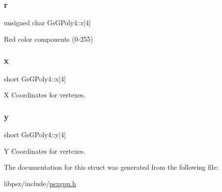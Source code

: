\subsubsection{\texorpdfstring{r}{r}}
{\footnotesize\ttfamily unsigned char Gs\+G\+Poly4\+::r\mbox{[}4\mbox{]}}



Red color components (0-\/255) 

\mbox{\label{structGsGPoly4_a90f4eabdef6d4b712a9a93d1b2a2d30c}} 
\subsubsection{\texorpdfstring{x}{x}}
{\footnotesize\ttfamily short Gs\+G\+Poly4\+::x\mbox{[}4\mbox{]}}



X Coordinates for vertexes. 

\mbox{\label{structGsGPoly4_a7c1e7cdef1183cdcf81f8293446fd9f4}} 
\subsubsection{\texorpdfstring{y}{y}}
{\footnotesize\ttfamily short Gs\+G\+Poly4\+::y\mbox{[}4\mbox{]}}



Y Coordinates for vertexes. 



The documentation for this struct was generated from the following file\+:\begin{DoxyCompactItemize}
\item 
libpsx/include/\hyperlink{psxgpu_8h}{psxgpu.\+h}\end{DoxyCompactItemize}
